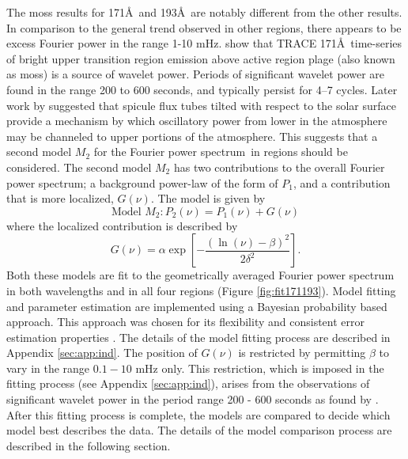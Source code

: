 \documentclass[onecolumn]{emulateapj}
\newcommand{\PS}{power spectrum}
\newcommand{\Fps}{Fourier \PS}
\newcommand{\BF}{ }
\begin{document}
The moss results for 171\AA\ and 193\AA\ are notably different from
the other results.  In comparison to the general trend observed in
other regions, there appears to be excess Fourier power in the range
1-10 mHz.  \cite{2003ApJ...595L..63D} show that {\BF TRACE}
171\AA\ time-series of bright upper transition region emission above
active region plage (also known as moss) is a source of wavelet
power. Periods of significant wavelet power are found in the range 200
to 600 seconds, and typically persist for 4–7 cycles.  Later work by
\cite{2005ApJ...624L..61D} suggested that spicule flux tubes tilted
with respect to the solar surface provide a mechanism by which
oscillatory power from lower in the atmosphere may be channeled to
upper portions of the atmosphere.  This suggests that a second model
$M_{2}$ for the \Fps\ in regions should be considered.  The second
model $M_{2}$ has two contributions to the overall \Fps; a background
power-law of the form of $P_{1}$, and a contribution that is more
localized, $G(\nu)$.  The model is given by
\begin{equation}
\label{eqn:pwrlawbump}
\mbox{Model $M_{2}$}: P_{2}(\nu) = P_{1}(\nu) + G(\nu)
\end{equation}
where the localized contribution is described by
\begin{equation}
\label{eqn:bump}
G(\nu) = \alpha\exp\left[-\frac{(\ln(\nu)-\beta)^{2}}{2\delta^{2}}\right].
\end{equation}
Both these models are fit to the geometrically averaged Fourier power
spectrum in both wavelengths and in all four regions (Figure
\ref{fig:fit171193}).  {\BF Model fitting and parameter estimation are
  implemented using a Bayesian probability based approach.}  This
approach was chosen for its flexibility and consistent error
estimation properties \citep{2013ApJ...769...89I}.  The details of the
model fitting process are described in Appendix \ref{sec:app:ind}.
The position of $G(\nu)$ is restricted by permitting $\beta$ to vary
in the range $0.1-10$ mHz only.  This restriction, which is imposed in
the fitting process (see Appendix \ref{sec:app:ind}), arises from the
observations of significant wavelet power in the period range 200 -
600 seconds as found by \cite{2003ApJ...595L..63D}.  {\BF After this
  fitting process is complete, the models are compared to decide which
  model best describes the data.  The details of the model comparison
  process are described in the following section.}
\end{document}
